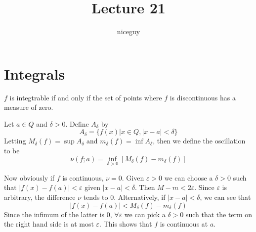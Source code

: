 \documentclass[12pt]{article}
\title{Lecture 21}
\author{niceguy}
\begin{document}
\maketitle

\section{Integrals}

\begin{thm}
    $f$ is integtrable if and only if the set of points where $f$ is discontinuous has a measure of zero.
\end{thm}

\begin{defn}[Oscillation]
    Let $a \in Q$ and $\delta > 0$. Define $A_\delta$ by
    $$A_\delta = \{f(x) | x \in Q, |x - a| < \delta\}$$
    Letting $M_\delta(f) = \sup A_\delta$ and $m_\delta(f) = \inf A_\delta$, then we define the oscillation to be
    $$\nu(f;a) = \inf_{\delta>0} [M_\delta(f) - m_\delta(f)]$$
\end{defn}

Now obviously if $f$ is continuous, $\nu = 0$. Given $\varepsilon > 0$ we can choose a $\delta > 0$ such that $|f(x) - f(a)| < \varepsilon$ given $|x - a| < \delta$. Then $M - m < 2\varepsilon$. Since $\varepsilon$ is arbitrary, the difference $\nu$ tends to 0. Alternatively, if $|x - a| < \delta$, we can see that
$$|f(x) - f(a)| < M_\delta(f) - m_\delta(f)$$
Since the infimum of the latter is 0, $\forall \varepsilon$ we can pick a $\delta > 0$ such that the term on the right hand side is at most $\varepsilon$. This shows that $f$ is continuous at $a$.
\end{document}
